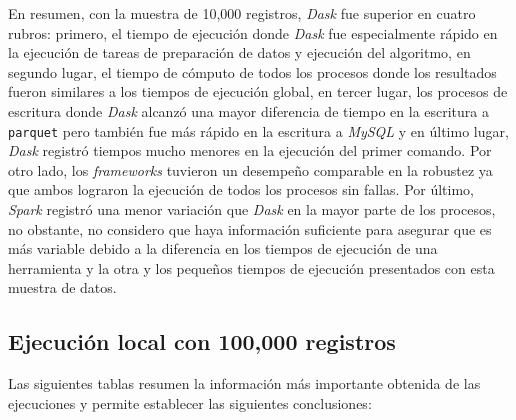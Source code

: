 En resumen, con la muestra de 10,000 registros, \textit{Dask} fue superior en cuatro rubros: primero, el tiempo de ejecución donde \textit{Dask} fue especialmente rápido en la ejecución de tareas de preparación de datos y ejecución del algoritmo, en segundo lugar, el tiempo de cómputo de todos los procesos donde los resultados fueron similares a los tiempos de ejecución global, en tercer lugar, los procesos de escritura donde \textit{Dask} alcanzó una mayor diferencia de tiempo en la escritura a \texttt{parquet} pero también fue más rápido en la escritura a \textit{MySQL} y en último lugar, \textit{Dask} registró tiempos mucho menores en la ejecución del primer comando. Por otro lado, los \textit{frameworks} tuvieron un desempeño comparable en la robustez ya que ambos lograron la ejecución de todos los procesos sin fallas. Por último, \textit{Spark} registró una menor variación que \textit{Dask} en la mayor parte de los procesos, no obstante, no considero que haya información suficiente para asegurar que es más variable debido a la diferencia en los tiempos de ejecución de una herramienta y la otra y los pequeños tiempos de ejecución presentados con esta muestra de datos.


\subsection{Ejecución local con 100,000 registros}

Las siguientes tablas resumen la información más importante obtenida de las ejecuciones y permite establecer las siguientes conclusiones:

